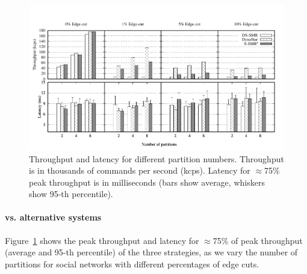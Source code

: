 \begin{figure}[ht!]
	\includegraphics{figures/socc/socc-throughput-latency-avg-all}
	\caption{Throughput and latency for different partition numbers. 
  Throughput is in thousands of commands per second (kcps). 
  Latency for $\approx$75\% peak throughput is in milliseconds (bars show average, whiskers show 95-th percentile).}
	\label{fig:varying_edge_cut}
\end{figure}






\paragraph*{\dynastar vs. alternative systems}
\label{sec:evaluation:results}

Figure~\ref{fig:varying_edge_cut} shows the peak throughput and latency for $\approx$75\% of peak throughput (average and 95-th percentile) of the three strategies, 
as we vary the number of partitions for social networks with different percentages of edge cuts.

